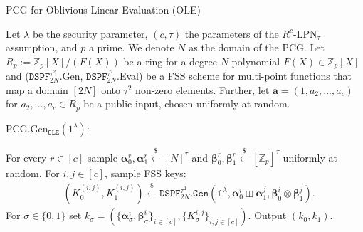 \begin{specialconstruction}{PCG for Oblivious Linear Evaluation (OLE)}
\label{construction:PCGforOLEImpl}
\vspace{1em} 

Let $\lambda$ be the security parameter, $(c,\tau)$ the parameters of the $R^c$-LPN$_\tau$ assumption, and $p$ a prime. We denote $N$ as the domain of the PCG. Let $R_p:=\mathbb{Z}_{p}[X]/(F(X))$ be a ring for a degree-$N$ polynomial $F(X) \in \mathbb{Z}_{p}[X]$ and ($\texttt{DSPF}^{\tau^2}_{2N}$.Gen, $\texttt{DSPF}^{\tau^2}_{2N}$.Eval) be a FSS scheme for multi-point functions that map a domain $[2N]$ onto $\tau^2$ non-zero elements. Further, let $\boldsymbol{a} = (1, a_2, ..., a_c)$ for $a_2, ...,a_c \in R_p$ be a public input, chosen uniformly at random.

\vspace{1em} 

PCG.Gen$_{\texttt{OLE}}(1^\lambda)$:
\begin{algorithmic}[1]
\State For every $r \in [c]$ sample $\boldsymbol{\alpha}_{0}^{r}, \boldsymbol{\alpha}_{1}^{r} \stackrel{\$}{\leftarrow}[N]^{\tau}$ and $\boldsymbol{\beta}_{0}^{r}, \boldsymbol{\beta}_{1}^{r} \stackrel{\$}{\leftarrow} [\mathbb{Z}_{p}]^{\tau}$ uniformly at random.
\State For $i, j \in [c]$, sample FSS keys:
\begin{align*}
& \left(K_{0}^{(i, j)}, K_{1}^{(i, j)}\right) \stackrel{\$}{\leftarrow} \texttt{DSPF}^{\tau^2}_{2N}\texttt{.Gen}\left(\mathds{1}^{\lambda}, \boldsymbol{\alpha}_{0}^{i} \boxplus \boldsymbol{\alpha}_{1}^{j}, \boldsymbol{\beta}_{0}^{i} \otimes \boldsymbol{\beta}_{1}^{j}\right).
\end{align*}
\State For $\sigma \in \{0,1\}$ set $k_\sigma = (\{\boldsymbol{\alpha}_\sigma^i, \boldsymbol{\beta}_\sigma^i\}_{i\in[c]}, \{K_\sigma^{i,j}\}_{i,j\in[c]})$.
\State Output $(k_0, k_1)$.
\end{algorithmic}

\vspace{1em} %


\end{specialconstruction}
